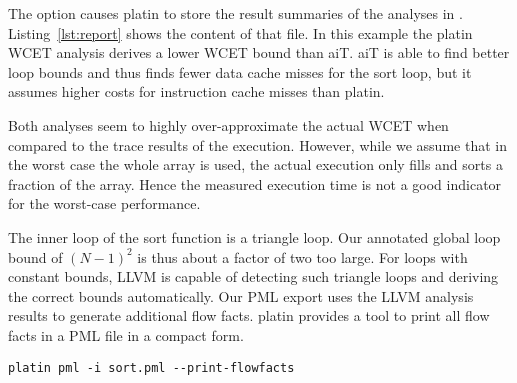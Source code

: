 The  option causes platin to store the result summaries of the analyses in
. Listing~\ref{lst:report} shows the content of that file.
In this example the platin WCET analysis derives a lower WCET bound than aiT.
aiT is able to find better loop bounds and thus finds
fewer data cache misses for the sort loop, but it assumes higher costs for instruction cache misses than platin.


Both analyses seem to highly over-approximate the actual WCET when compared to the trace results of the
execution. However, while we assume that in the worst case the whole array is used, the actual execution only fills and sorts a fraction of the array.
Hence the measured execution time is not a good indicator for the worst-case performance.

The inner loop of the sort function is a triangle loop. Our annotated global loop bound of $(N-1)^2$ is thus about a
factor of two too large. For loops with constant bounds, LLVM is capable of
detecting such triangle loops and deriving the correct bounds automatically.
Our PML export uses the LLVM analysis results to generate additional flow facts.
platin provides a tool to print all flow facts in a PML file in a compact form.

\begin{verbatim}
platin pml -i sort.pml --print-flowfacts
\end{verbatim}


